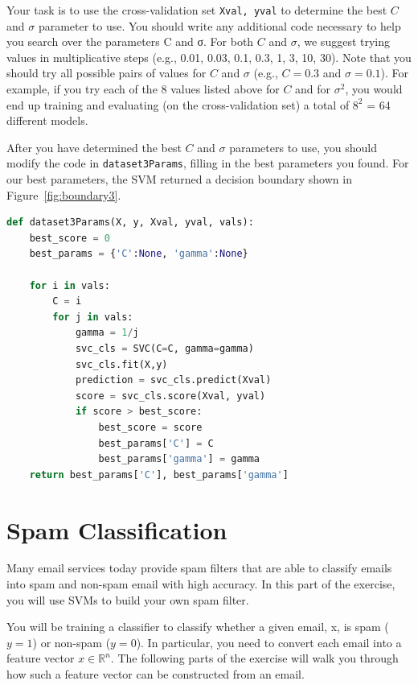 \documentclass[12pt]{article}
\begin{document}
Your task is to use the cross-validation set \texttt{Xval, yval} to determine the best $C$ and $\sigma$ parameter to use. You should write any additional code necessary to help you search over the parameters C and σ. For both $C$ and $\sigma$, we suggest trying values in multiplicative steps (e.g., 0.01, 0.03, 0.1, 0.3, 1, 3, 10, 30). Note that you should try all possible pairs of values for $C$ and $\sigma$ (e.g., $C = 0.3$ and $\sigma = 0.1$). For example, if you try each of the 8 values listed above for $C$ and for $\sigma^2$, you would end up training and evaluating (on the cross-validation set) a total of $8^2$ = 64 different models.

After you have determined the best $C$ and $\sigma$ parameters to use, you should modify the code in \texttt{dataset3Params}, filling in the best parameters you found. For our best parameters, the SVM returned a decision boundary shown in Figure~\ref{fig:boundary3}.

\begin{lstlisting}[language=Python]
def dataset3Params(X, y, Xval, yval, vals):
    best_score = 0
    best_params = {'C':None, 'gamma':None}

    for i in vals:
        C = i
        for j in vals:
            gamma = 1/j
            svc_cls = SVC(C=C, gamma=gamma)
            svc_cls.fit(X,y)
            prediction = svc_cls.predict(Xval)
            score = svc_cls.score(Xval, yval)
            if score > best_score:
                best_score = score
                best_params['C'] = C
                best_params['gamma'] = gamma
    return best_params['C'], best_params['gamma']
\end{lstlisting}

\hrulefill

\section{Spam Classification}

Many email services today provide spam filters that are able to classify emails into spam and non-spam email with high accuracy. In this part of the exercise, you will use SVMs to build your own spam filter.

You will be training a classifier to classify whether a given email, x, is spam ($y = 1$) or non-spam ($y = 0$). In particular, you need to convert each email into a feature vector $x \in \mathbb{R}^n$. The following parts of the exercise will walk you through how such a feature vector can be constructed from an email.
\end{document}
